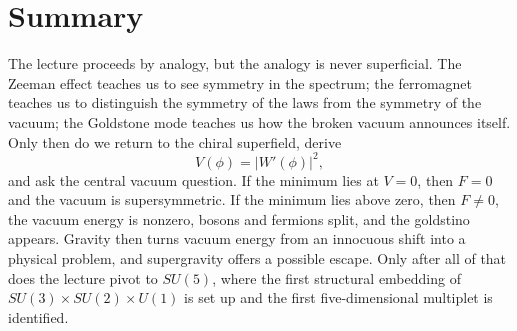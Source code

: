 \section{Summary}

The lecture proceeds by analogy, but the analogy is never superficial. The Zeeman effect teaches us to see symmetry in the spectrum; the ferromagnet teaches us to distinguish the symmetry of the laws from the symmetry of the vacuum; the Goldstone mode teaches us how the broken vacuum announces itself. Only then do we return to the chiral superfield, derive
\begin{equation}
V(\phi)=|W'(\phi)|^2,
\end{equation}
and ask the central vacuum question. If the minimum lies at \(V=0\), then \(F=0\) and the vacuum is supersymmetric. If the minimum lies above zero, then \(F\neq 0\), the vacuum energy is nonzero, bosons and fermions split, and the goldstino appears. Gravity then turns vacuum energy from an innocuous shift into a physical problem, and supergravity offers a possible escape. Only after all of that does the lecture pivot to \(SU(5)\), where the first structural embedding of \(SU(3)\times SU(2)\times U(1)\) is set up and the first five-dimensional multiplet is identified.